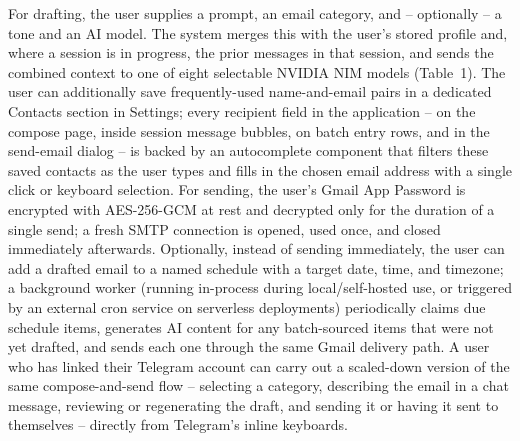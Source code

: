 \documentclass[12pt,a4paper]{article}
\begin{document}
For drafting, the user supplies a prompt, an email category, and -- optionally -- a tone and an AI model. The system merges this with the user's stored profile and, where a session is in progress, the prior messages in that session, and sends the combined context to one of eight selectable NVIDIA NIM models (Table~1). The user can additionally save frequently-used name-and-email pairs in a dedicated Contacts section in Settings; every recipient field in the application -- on the compose page, inside session message bubbles, on batch entry rows, and in the send-email dialog -- is backed by an autocomplete component that filters these saved contacts as the user types and fills in the chosen email address with a single click or keyboard selection. For sending, the user's Gmail App Password is encrypted with AES-256-GCM at rest and decrypted only for the duration of a single send; a fresh SMTP connection is opened, used once, and closed immediately afterwards. Optionally, instead of sending immediately, the user can add a drafted email to a named schedule with a target date, time, and timezone; a background worker (running in-process during local/self-hosted use, or triggered by an external cron service on serverless deployments) periodically claims due schedule items, generates AI content for any batch-sourced items that were not yet drafted, and sends each one through the same Gmail delivery path. A user who has linked their Telegram account can carry out a scaled-down version of the same compose-and-send flow -- selecting a category, describing the email in a chat message, reviewing or regenerating the draft, and sending it or having it sent to themselves -- directly from Telegram's inline keyboards.
\end{document}
